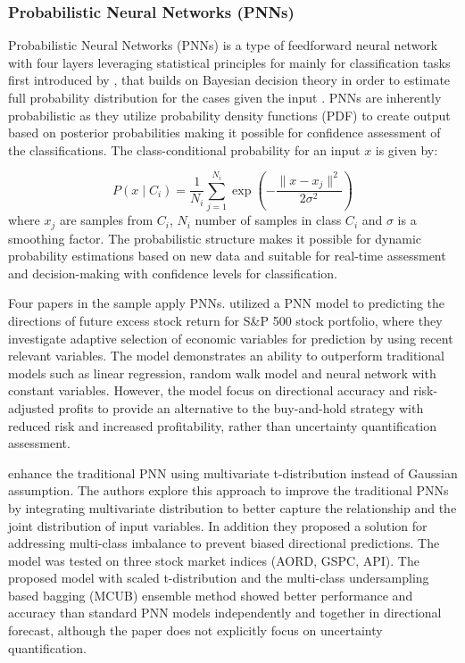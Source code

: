 
\subsubsection{Probabilistic Neural Networks (PNNs)}
Probabilistic Neural Networks (PNNs) is a type of feedforward neural network with four layers leveraging statistical principles for mainly for classification tasks first introduced by \textcite{Specht1990pnn}, that builds on Bayesian decision theory in order to estimate full probability distribution for the cases given the input \parencite{Specht1990pnn}. PNNs are inherently probabilistic as they utilize probability density functions (PDF) to create output based on posterior probabilities making it possible for confidence assessment of the classifications. The class-conditional probability for an input $x$ is given by:

\begin{equation}
P(x \mid C_i) = \frac{1}{N_i} \sum_{j=1}^{N_i} \exp \left( -\frac{\| x - x_j \|^2}{2\sigma^2} \right)
\end{equation}
where $x_j$ are samples from $C_i$, $N_i$ number of samples in class $C_i$ and $\sigma$ is a smoothing factor. 
The probabilistic structure makes it possible for dynamic probability estimations based on new data and suitable for real-time assessment and decision-making with confidence levels for classification. 

Four papers in the sample apply PNNs.
\textcite{Thawornwong2004pnn} utilized a PNN model to predicting the directions of future
excess stock return for S\&P 500 stock portfolio, where they investigate adaptive selection of economic variables for prediction by using recent relevant variables. The model demonstrates an ability to outperform traditional models such as linear regression, random walk model and neural network with constant variables. However, the model focus on directional accuracy and risk-adjusted profits to provide an alternative to the buy-and-hold strategy with reduced risk and increased profitability, rather than uncertainty quantification assessment.  

\textcite{Chandrasekara2019pnn} enhance the traditional PNN using multivariate t-distribution instead of Gaussian assumption. The authors explore this approach to improve the traditional PNNs by integrating multivariate distribution to better capture the relationship and the joint distribution of input variables. In addition they proposed a solution for addressing multi-class imbalance to prevent biased directional predictions. The model was tested on three stock market indices (AORD, GSPC, API). The proposed model with scaled t-distribution and  the multi-class undersampling based bagging (MCUB) ensemble method showed better performance and accuracy than standard PNN models independently and together in directional forecast, although the paper does not explicitly focus on uncertainty quantification.  

